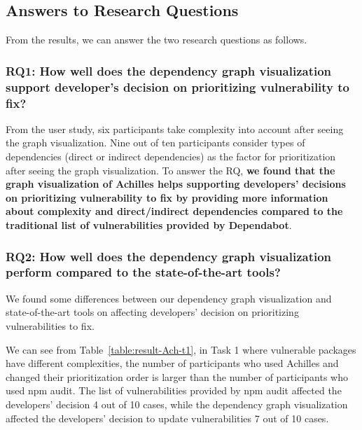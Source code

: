 \documentclass[conference]{IEEEtran}
\begin{document}
	
\subsection{Answers to Research Questions}
	From the results, we can answer the two research questions as follows.
	
\subsubsection{RQ1: How well does the dependency graph visualization support developer’s decision on prioritizing vulnerability to fix?}
	From the user study, six participants take complexity into account after seeing the graph visualization. Nine out of ten participants consider types of dependencies (direct or indirect dependencies) as the factor for prioritization after seeing the graph visualization.
	To answer the RQ, \textbf{we found that the graph visualization of Achilles helps supporting developers' decisions on prioritizing vulnerability to fix by providing more information about complexity and direct/indirect dependencies compared to the traditional list of vulnerabilities provided by Dependabot}.
	
\subsubsection{RQ2: How well does the dependency graph visualization perform compared to the state-of-the-art tools?}
	
We found some differences between our dependency graph visualization and state-of-the-art tools on affecting developers' decision on prioritizing vulnerabilities to fix. 
	
We can see from Table~\ref{table:result-Ach-t1}, in Task 1 where vulnerable packages have different complexities, the number of participants who used Achilles and changed their prioritization order is larger than the number of participants who used npm audit. The list of vulnerabilities provided by npm audit affected the developers' decision 4 out of 10 cases, while the dependency graph visualization affected the developers' decision to update vulnerabilities 7 out of 10 cases. %
	
\end{document}
